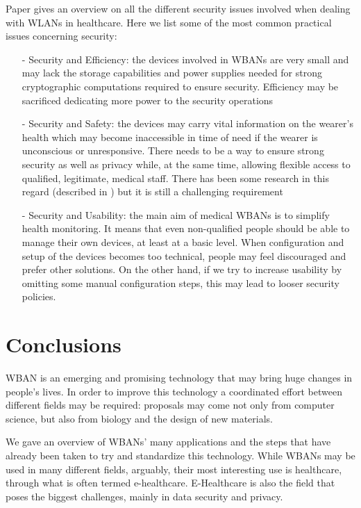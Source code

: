 \documentclass[conference]{IEEEtran}
\begin{document}
Paper \cite{li2010data} gives an overview on all the different security issues involved when dealing with WLANs in healthcare. Here we list some of the most common practical issues concerning security:
	\begin{itemize}
		\item[-] Security and Efficiency: the devices involved in WBANs are very small and may lack the storage capabilities and power supplies needed for strong cryptographic computations required to ensure security. Efficiency may be sacrificed dedicating more power to the security operations
		\item[-]  Security and Safety: the devices may carry vital information on the wearer’s health which may become inaccessible in time of need if the wearer is unconscious or unresponsive. There needs to be a way to ensure strong security as well as privacy while, at the same time, allowing flexible access to qualified, legitimate, medical staff. There has been some research in this regard (described in \cite{li2010data}) but it is still a challenging requirement
		\item[-] Security and Usability: the main aim of medical WBANs is to simplify health monitoring. It means that even non-qualified people should be able to manage their own devices, at least at a basic level. When configuration and setup of the devices becomes too technical, people may feel discouraged and prefer other solutions. On the other hand, if we try to increase usability by omitting some manual configuration steps, this may lead to looser security policies.
	\end{itemize}


\section{Conclusions}
WBAN is an emerging and promising technology that may bring huge changes in people’s lives. In order to improve this technology a coordinated effort between different fields may be required: proposals may come not only from computer science, but also from biology and the design of new materials. 

We gave an overview of WBANs' many applications and the steps that have already been taken to try and standardize this technology. While WBANs may be used in many different fields, arguably, their most interesting use is healthcare, through what is often termed e-healthcare. E-Healthcare is also the field that poses the biggest challenges, mainly in data security and privacy.
\end{document}
